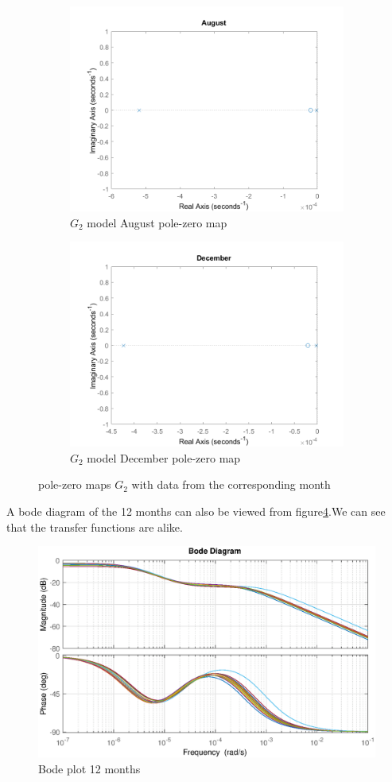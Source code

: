 \documentclass[a4paper,12pt]{article}
\numberwithin{equation}{section}
\begin{document}
\begin{figure}[H]
\begin{subfigure}{.5\textwidth}
  \centering
  \includegraphics[width=.7\linewidth]{G2_aug_pzmap.png}
  \caption{$G_{2}$ model August pole-zero map}
  \label{fig:G2_aug_pzmap}
\end{subfigure}%
\begin{subfigure}{.5\textwidth}
  \centering
  \includegraphics[width=.7\linewidth]{G2_dec_pzmap.png}
  \caption{$G_{2}$ model December pole-zero map}
  \label{fig:G2_dec_pzmap}
\end{subfigure}
\caption{pole-zero maps $G_{2}$ with data from the corresponding month}
\label{fig:pzmapmanymonths}
\end{figure}

A bode diagram of the 12 months can also be viewed from figure\ref{fig;bodeG2}.We can see that the transfer functions are alike.

\begin{figure}[H]
    \includegraphics[width=\textwidth]{Bode_plot_Jan_Dec.eps}
    \centering
    \caption{Bode plot 12 months}
    \label{fig;bodeG2}
\end{figure}
\end{document}

